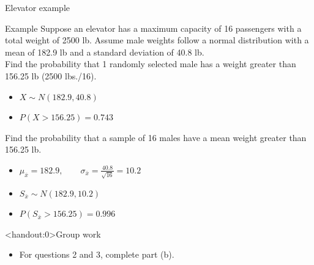 \documentclass[xcolor=table, handout]{beamer}
\begin{document}
\begin{frame}{Elevator example}
\begin{exampleblock}{Example}
Suppose an elevator has a maximum capacity of 16 passengers with a total weight of 2500 lb. Assume male weights follow a normal distribution with a mean of 182.9 lb and a standard deviation of 40.8 lb. \\
\medskip
Find the probability that 1 randomly selected male has a weight greater than 156.25 lb (2500 lbs./16).
\begin{itemize}
\pause\item $X \sim N(182.9, 40.8)$
\pause\item $P( X > 156.25) = 0.743$
\end{itemize}
\pause\medskip
Find the probability that a sample of 16 males have a mean weight greater than 156.25 lb. 
\begin{itemize}
\pause\item $\mu_{\bar x} = 182.9, \qquad \sigma_{\bar x} = \frac {40.8}{\sqrt{16}} = 10.2$
\pause\item $S_{\bar x} \sim N(182.9, 10.2)$
\pause\item $P(S_{\bar x} > 156.25) = 0.996$
\end{itemize}
\end{exampleblock}
\end{frame}

\begin{frame}<handout:0>{Group work}
\begin{block}{}
\large
\begin{itemize}
\item For questions 2 and 3, complete part (b).
\end{itemize}
\end{block}
\end{frame}
\end{document}
